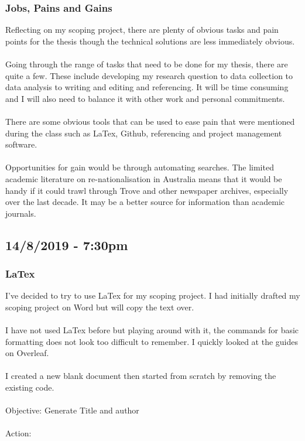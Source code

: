 \documentclass{article}
\begin{document}
\subsubsection*{Jobs, Pains and Gains }
Reflecting on my scoping project, there are plenty of obvious tasks and pain points for the thesis though the technical solutions are less immediately obvious.\\\\
Going through the range of tasks that need to be done for my thesis, there are quite a few. These include developing my research question to data collection to data analysis to writing and editing and referencing. It will be time consuming and I will also need to balance it with other work and personal commitments.\\\\
There are some obvious tools that can be used to ease pain that were mentioned during the class such as LaTex, Github, referencing and project management software.\\\\
Opportunities for gain would be through automating searches. The limited academic literature on re-nationalisation in Australia means that it would be handy if it could trawl through Trove and other newspaper archives, especially over the last decade. It may be a better source for information than academic journals.

\subsection*{14/8/2019 - 7:30pm}
\subsubsection*{LaTex}
I’ve decided to try to use LaTex for my scoping project. I had initially drafted my scoping project on Word but will copy the text over.\\\\
I have not used LaTex before but playing around with it, the commands for basic formatting does not look too difficult to remember. I quickly looked at the guides on Overleaf.\\\\
I created a new blank document then started from scratch by removing the existing code.\\\\
Objective: Generate Title and author\\\\
Action:
\end{document}
